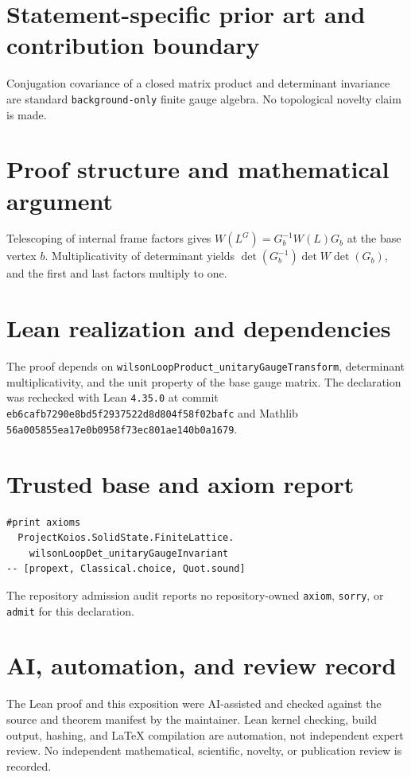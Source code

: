 \documentclass[11pt]{article}
\begin{document}
\section{Statement-specific prior art and contribution boundary}
Conjugation covariance of a closed matrix product and determinant invariance are standard \texttt{background-only} finite gauge algebra.  No topological novelty claim is made.

\section{Proof structure and mathematical argument}
Telescoping of internal frame factors gives $W(L^G)=G_b^{-1}W(L)G_b$ at the base vertex $b$.  Multiplicativity of determinant yields
$\det(G_b^{-1})\det W\det(G_b)$, and the first and last factors multiply to one.

\section{Lean realization and dependencies}
The proof depends on \texttt{wilsonLoopProduct\_unitaryGaugeTransform}, determinant multiplicativity, and the unit property of the base gauge matrix.  The declaration was rechecked with Lean \texttt{4.35.0} at commit \texttt{eb6cafb7290e8bd5f2937522d8d804f58f02bafc} and Mathlib \texttt{56a005855ea17e0b0958f73ec801ae140b0a1679}.

\section{Trusted base and axiom report}
\begin{verbatim}
#print axioms
  ProjectKoios.SolidState.FiniteLattice.
    wilsonLoopDet_unitaryGaugeInvariant
-- [propext, Classical.choice, Quot.sound]
\end{verbatim}
The repository admission audit reports no repository-owned \texttt{axiom}, \texttt{sorry}, or
\texttt{admit} for this declaration.

\section{AI, automation, and review record}
The Lean proof and this exposition were AI-assisted and checked against the source and theorem
manifest by the maintainer.  Lean kernel checking, build output, hashing, and LaTeX compilation are
automation, not independent expert review.  No independent mathematical, scientific, novelty, or
publication review is recorded.
\end{document}
